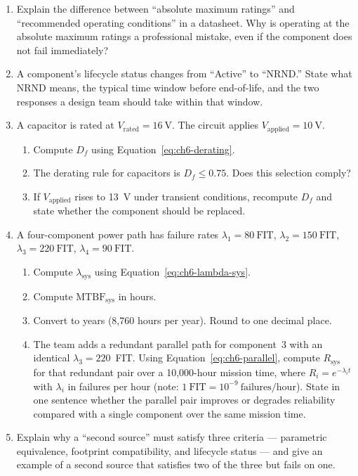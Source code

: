 \begin{enumerate}
  \item[\textbf{Q1.}] Explain the difference between ``absolute maximum ratings'' and ``recommended operating conditions'' in a datasheet.
        Why is operating at the absolute maximum ratings a professional mistake, even if the component does not fail immediately?

  \item[\textbf{Q2.}] A component's lifecycle status changes from ``Active'' to ``NRND.''
        State what NRND means, the typical time window before end-of-life, and the two responses a design team should take within that window.

  \item[\textbf{Q3.}] A capacitor is rated at $V_{\text{rated}} = 16~\mathrm{V}$.
        The circuit applies $V_{\text{applied}} = 10~\mathrm{V}$.
        \begin{enumerate}
          \item[(a)] Compute $D_f$ using Equation~\ref{eq:ch6-derating}.
          \item[(b)] The derating rule for capacitors is $D_f \leq 0.75$.
                     Does this selection comply?
          \item[(c)] If $V_{\text{applied}}$ rises to 13~V under transient conditions,
                     recompute $D_f$ and state whether the component should be replaced.
        \end{enumerate}

  \item[\textbf{Q4.}] A four-component power path has failure rates
        $\lambda_1 = 80~\mathrm{FIT}$, $\lambda_2 = 150~\mathrm{FIT}$,
        $\lambda_3 = 220~\mathrm{FIT}$, $\lambda_4 = 90~\mathrm{FIT}$.
        \begin{enumerate}
          \item[(a)] Compute $\lambda_{\text{sys}}$ using Equation~\ref{eq:ch6-lambda-sys}.
          \item[(b)] Compute $\mathrm{MTBF}_{\text{sys}}$ in hours.
          \item[(c)] Convert to years (8{,}760 hours per year). Round to one decimal place.
          \item[(d)] The team adds a redundant parallel path for component~3 with an identical $\lambda_3 = 220$~FIT.
                     Using Equation~\ref{eq:ch6-parallel}, compute $R_{\text{sys}}$ for that redundant pair over a 10{,}000-hour mission time, where $R_i = e^{-\lambda_i t}$ with $\lambda_i$ in failures per hour (note: $1~\text{FIT} = 10^{-9}~\text{failures/hour}$).
                     State in one sentence whether the parallel pair improves or degrades reliability compared with a single component over the same mission time.
        \end{enumerate}

  \item[\textbf{Q5.}] Explain why a ``second source'' must satisfy three criteria ---
        parametric equivalence, footprint compatibility, and lifecycle status ---
        and give an example of a second source that satisfies two of the three
        but fails on one.
\end{enumerate}

